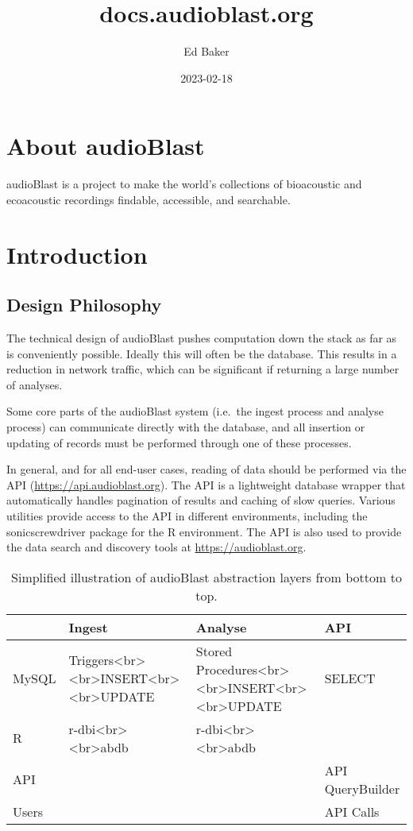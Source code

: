 \documentclass[
]{book}
\title{docs.audioblast.org}
\author{Ed Baker}
\date{2023-02-18}
\begin{document}
\maketitle

{
\setcounter{tocdepth}{1}
\tableofcontents
}
\hypertarget{about-audioblast}{%
\chapter{About audioBlast}\label{about-audioblast}}

audioBlast is a project to make the world's collections of bioacoustic and ecoacoustic recordings findable, accessible, and searchable.

\hypertarget{introduction}{%
\chapter{Introduction}\label{introduction}}

\hypertarget{design-philosophy}{%
\section{Design Philosophy}\label{design-philosophy}}

The technical design of audioBlast pushes computation down the stack as far as is conveniently possible. Ideally this will often be the database. This results in a reduction in network traffic, which can be significant if returning a large number of analyses.

Some core parts of the audioBlast system (i.e.~the ingest process and analyse process) can communicate directly with the database, and all insertion or updating of records must be performed through one of these processes.

In general, and for all end-user cases, reading of data should be performed via the API (\url{https://api.audioblast.org}). The API is a lightweight database wrapper that automatically handles pagination of results and caching of slow queries. Various utilities provide access to the API in different environments, including the sonicscrewdriver package for the R environment. The API is also used to provide the data search and discovery tools at \url{https://audioblast.org}.

\begin{table}

\caption{\label{tab:unnamed-chunk-1}Simplified illustration of audioBlast abstraction layers from 
  bottom to top.}
\centering
\begin{tabular}[t]{llll}
\toprule
  & Ingest & Analyse & API\\
\midrule
MySQL & Triggers<br><br>INSERT<br><br>UPDATE & Stored Procedures<br><br>INSERT<br><br>UPDATE & SELECT\\
R & r-dbi<br><br>abdb & r-dbi<br><br>abdb & \\
API &  &  & API QueryBuilder\\
Users &  &  & API Calls\\
\bottomrule
\end{tabular}
\end{table}
\end{document}
